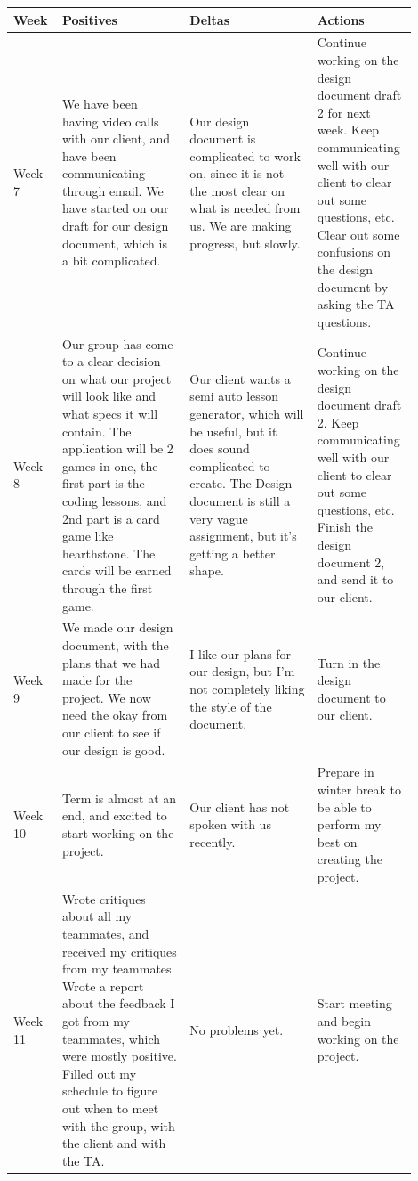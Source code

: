 \documentclass[draftclsnofoot,10pt,onecolumn]{IEEEtran}
\begin{document}
        \newpage
        \begin{tabular}{p{0.1\linewidth}p{0.3\linewidth}p{0.3\linewidth}p{0.2\linewidth}}
        \hline
            \textbf{Week}
             & \textbf{Positives}
             & \textbf{Deltas}
             & \textbf{Actions}\\
            \hline
             Week 7
             & We have been having video calls with our client, and have been communicating through email. We have started on our draft for our design document, which is a bit complicated.
             & Our design document is complicated to work on, since it is not the most clear on what is needed from us. We are making progress, but slowly.
             & Continue working on the design document draft 2 for next week. Keep communicating well with our client to clear out some questions, etc. Clear out some confusions on the design document by asking the TA questions.\\
            \hline
             Week 8
             & Our group has come to a clear decision on what our project will look like and what specs it will contain. The application will be 2 games in one, the first part is the coding lessons, and 2nd part is a card game like hearthstone. The cards will be earned through the first game.
             & Our client wants a semi auto lesson generator, which will be useful, but it does sound complicated to create. The Design document is still a very vague assignment, but it’s getting a better shape.
             & Continue working on the design document draft 2. Keep communicating well with our client to clear out some questions, etc. Finish the design document 2, and send it to our client.\\
            \hline
             Week 9
             & We made our design document, with the plans that we had made for the project. We now need the okay from our client to see if our design is good.
             & I like our plans for our design, but I'm not completely liking the style of the document.
             & Turn in the design document to our client.\\
            \hline
             Week 10
             & Term is almost at an end, and excited to start working on the project.
             & Our client has not spoken with us recently.
             & Prepare in winter break to be able to perform my best on creating the project.\\
            \hline
             Week 11
             & Wrote critiques about all my teammates, and received my critiques from my teammates. Wrote a report about the feedback I got from my teammates, which were mostly positive. Filled out my schedule to figure out when to meet with the group, with the client and with the TA.
             & No problems yet.
             & Start meeting and begin working on the project.\\
             \end{tabular}
\end{document}
